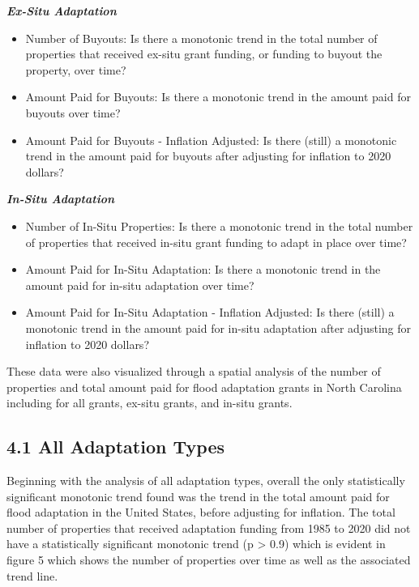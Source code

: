 \documentclass[
  12pt,
]{article}
\begin{document}
\textbf{\emph{Ex-Situ Adaptation}}

\begin{itemize}
\item
  Number of Buyouts: Is there a monotonic trend in the total number of
  properties that received ex-situ grant funding, or funding to buyout
  the property, over time?
\item
  Amount Paid for Buyouts: Is there a monotonic trend in the amount paid
  for buyouts over time?
\item
  Amount Paid for Buyouts - Inflation Adjusted: Is there (still) a
  monotonic trend in the amount paid for buyouts after adjusting for
  inflation to 2020 dollars?
\end{itemize}

\textbf{\emph{In-Situ Adaptation}}

\begin{itemize}
\item
  Number of In-Situ Properties: Is there a monotonic trend in the total
  number of properties that received in-situ grant funding to adapt in
  place over time?
\item
  Amount Paid for In-Situ Adaptation: Is there a monotonic trend in the
  amount paid for in-situ adaptation over time?
\item
  Amount Paid for In-Situ Adaptation - Inflation Adjusted: Is there
  (still) a monotonic trend in the amount paid for in-situ adaptation
  after adjusting for inflation to 2020 dollars?
\end{itemize}

These data were also visualized through a spatial analysis of the number
of properties and total amount paid for flood adaptation grants in North
Carolina including for all grants, ex-situ grants, and in-situ grants.

\hypertarget{all-adaptation-types}{%
\subsection{4.1 All Adaptation Types}\label{all-adaptation-types}}

Beginning with the analysis of all adaptation types, overall the only
statistically significant monotonic trend found was the trend in the
total amount paid for flood adaptation in the United States, before
adjusting for inflation. The total number of properties that received
adaptation funding from 1985 to 2020 did not have a statistically
significant monotonic trend (p \textgreater{} 0.9) which is evident in
figure 5 which shows the number of properties over time as well as the
associated trend line.
\end{document}

